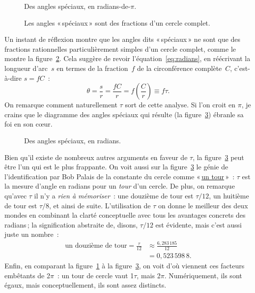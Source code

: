 \begin{figure}
\begin{center}
\end{center}
\caption{Des angles spéciaux, en radians-de-$\pi$.\label{fig:pi_angles}}
\end{figure}

\begin{figure}
\begin{center}
\end{center}
\caption{Les angles «\,spéciaux\,» sont des fractions d'un cercle
complet.\label{fig:angle_fractions}}
\end{figure}

Un instant de réflexion montre que les angles dits «\,spéciaux\,» ne sont que
des fractions rationnelles particulièrement simples d'un cercle complet, comme
le montre la figure~\ref{fig:angle_fractions}. Cela suggère de revoir
l'équation~\eqref{eq:radians}, en réécrivant la longueur d'arc~$s$ en termes de
la fraction~$f$ de la circonférence complète~$C$, c'est-à-dire $s = f C$~:
\[ \theta = \frac{s}{r} = \frac{fC}{r} =  f\left(\frac{C}{r}\right) \equiv f\tau. \]
On remarque comment naturellement $\tau$ sort de cette analyse. Si l'on croit en
$\pi$, je crains que le diagramme des angles spéciaux qui résulte (la
figure~\ref{fig:tau_angles}) ébranle sa foi en son cœur.

\begin{figure}
\begin{center}
\end{center}
\caption{Des angles spéciaux, en radians.\label{fig:tau_angles}}
\end{figure}

Bien qu'il existe de nombreux autres arguments en faveur de $\tau$, la
figure~\ref{fig:tau_angles} peut être l'un qui est le plus frappante. On voit
aussi sur la figure~\ref{fig:tau_angles} le génie de l'identification par Bob
Palais de la constante du cercle comme
«\,\href{https://fr.wikipedia.org/wiki/Tour_(angle)}{un tour}\,»~: $\tau$ est la
mesure d'angle en radians pour un \emph{tour} d'un cercle. De plus, on remarque
qu'avec $\tau$ il n'y a \emph{rien à mémoriser}~: une douzième de tour est
$\tau/12$, un huitième de tour est $\tau/8$, et ainsi de suite. L'utilisation de
$\tau$ on donne le meilleur des deux mondes en combinant la clarté conceptuelle
avec tous les avantages concrets des radians\,; la signification abstraite de,
disons, $\tau/12$ est évidente, mais c'est aussi juste un nombre~:
\[
\begin{split}
\mbox{un douzième de tour} = \frac{\tau}{12} & \approx \frac{6{,}283\,185}{12} \\
                                             & = 0{,}523\,598\,8.
\end{split}
\]
Enfin, en comparant la figure~\ref{fig:pi_angles} à la
figure~\ref{fig:tau_angles}, on voit d'où viennent ces facteurs embêtants de
2$\pi$~: un tour de cercle vaut 1$\tau$, mais 2$\pi$. Numériquement, ils sont
égaux, mais conceptuellement, ils sont assez distincts.

